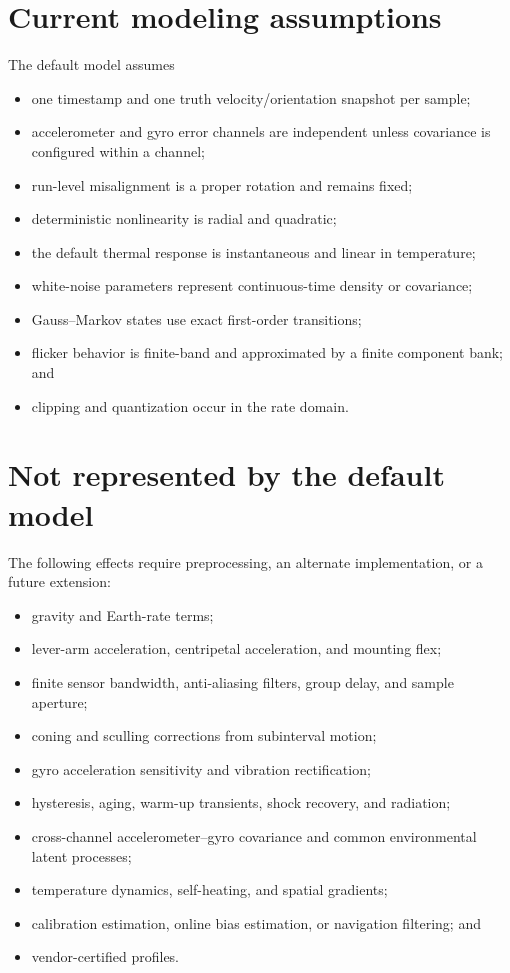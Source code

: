 \documentclass[11pt,oneside,headings=big]{scrreprt}
\begin{document}
    \section{Current modeling assumptions}
    The default model assumes
    \begin{itemize}
        \item one timestamp and one truth velocity/orientation snapshot per sample;
        \item accelerometer and gyro error channels are independent unless covariance
        is configured within a channel;
        \item run-level misalignment is a proper rotation and remains fixed;
        \item deterministic nonlinearity is radial and quadratic;
        \item the default thermal response is instantaneous and linear in temperature;
        \item white-noise parameters represent continuous-time density or covariance;
        \item Gauss--Markov states use exact first-order transitions;
        \item flicker behavior is finite-band and approximated by a finite component
        bank; and
        \item clipping and quantization occur in the rate domain.
    \end{itemize}


    \section{Not represented by the default model}
    The following effects require preprocessing, an alternate implementation, or a
    future extension:
    \begin{itemize}
        \item gravity and Earth-rate terms;
        \item lever-arm acceleration, centripetal acceleration, and mounting flex;
        \item finite sensor bandwidth, anti-aliasing filters, group delay, and sample
        aperture;
        \item coning and sculling corrections from subinterval motion;
        \item gyro acceleration sensitivity and vibration rectification;
        \item hysteresis, aging, warm-up transients, shock recovery, and radiation;
        \item cross-channel accelerometer--gyro covariance and common environmental
        latent processes;
        \item temperature dynamics, self-heating, and spatial gradients;
        \item calibration estimation, online bias estimation, or navigation filtering;
        and
        \item vendor-certified profiles.
    \end{itemize}
\end{document}
